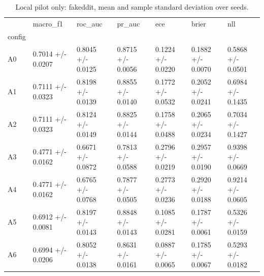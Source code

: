\begin{table}
\caption{Local pilot only: fakeddit, mean and sample standard deviation over seeds.}
\label{tab:pilot_fakeddit}
\begin{tabular}{lllllll}
\toprule
 & macro\_f1 & roc\_auc & pr\_auc & ece & brier & nll \\
config &  &  &  &  &  &  \\
\midrule
A0 & 0.7014 +/- 0.0207 & 0.8045 +/- 0.0125 & 0.8715 +/- 0.0056 & 0.1224 +/- 0.0220 & 0.1882 +/- 0.0070 & 0.5868 +/- 0.0501 \\
A1 & 0.7111 +/- 0.0323 & 0.8198 +/- 0.0139 & 0.8855 +/- 0.0140 & 0.1772 +/- 0.0532 & 0.2052 +/- 0.0241 & 0.6984 +/- 0.1435 \\
A2 & 0.7111 +/- 0.0323 & 0.8124 +/- 0.0149 & 0.8825 +/- 0.0144 & 0.1758 +/- 0.0488 & 0.2065 +/- 0.0234 & 0.7034 +/- 0.1427 \\
A3 & 0.4771 +/- 0.0162 & 0.6671 +/- 0.0872 & 0.7813 +/- 0.0588 & 0.2796 +/- 0.0219 & 0.2957 +/- 0.0190 & 0.9398 +/- 0.0669 \\
A4 & 0.4771 +/- 0.0162 & 0.6765 +/- 0.0768 & 0.7877 +/- 0.0505 & 0.2773 +/- 0.0236 & 0.2920 +/- 0.0188 & 0.9214 +/- 0.0605 \\
A5 & 0.6912 +/- 0.0081 & 0.8197 +/- 0.0143 & 0.8848 +/- 0.0143 & 0.1085 +/- 0.0281 & 0.1787 +/- 0.0061 & 0.5326 +/- 0.0159 \\
A6 & 0.6994 +/- 0.0206 & 0.8052 +/- 0.0138 & 0.8631 +/- 0.0161 & 0.0887 +/- 0.0065 & 0.1785 +/- 0.0067 & 0.5293 +/- 0.0182 \\
\bottomrule
\end{tabular}
\end{table}
